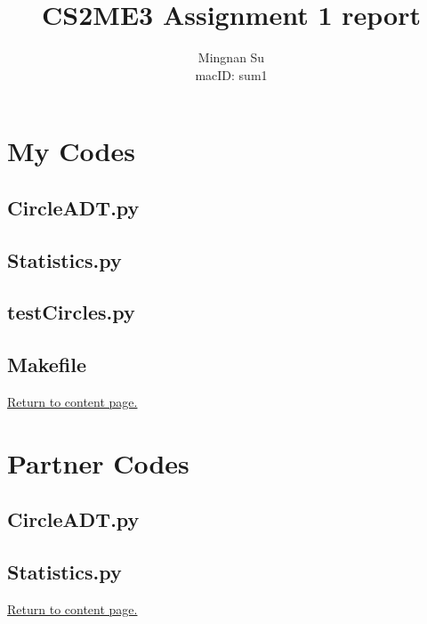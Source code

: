 \documentclass[12pt]{article}
\begin{document}
\title{CS2ME3 Assignment 1 report}
\author{Mingnan Su \\ macID: sum1}
\maketitle
{}
\tableofcontents
\newpage

\section{My Codes}

\subsection{CircleADT.py}

\newpage

\subsection{Statistics.py}

\newpage

\subsection{testCircles.py}

\vskip 10cm

\subsection{Makefile}

\newpage

\hyperlink{toc}{Return to content page.}
\section{Partner Codes}

\subsection{CircleADT.py}

\vskip 5cm

\subsection{Statistics.py}

\newpage

\hyperlink{toc}{Return to content page.}
\end{document}
